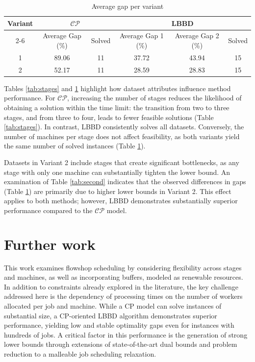 \documentclass[a4paper,final]{article}
\begin{document}
        \begin{table}[H]
            \centering
            \caption{Average gap per variant}
            \label{tab:machines}
            \begin{tabular}{|c|cc|ccc|}
            \hline
            \multirow{2}{*}{Variant} & \multicolumn{2}{|c|}{$\mathcal{CP}$} & \multicolumn{3}{|c|}{LBBD}                         \\ \cline{2-6}
                                     & Average Gap (\%)      & Solved     & Average Gap 1 (\%) & Average Gap 2 (\%) & Solved \\ \hline
            1                        & 89.06                 & 11         & 37.72              & 43.94              & 15     \\
            2                        & 52.17                 & 11         & 28.59              & 28.83              & 15 \\ \hline
            \end{tabular}
        \end{table}

        Tables \ref{tab:stages} and \ref{tab:machines} highlight how dataset attributes influence method performance. For $\mathcal{CP}$, increasing the number of stages reduces the likelihood of obtaining a solution within the time limit: the transition from two to three stages, and from three to four, leads to fewer feasible solutions (Table \ref{tab:stages}). In contrast, LBBD consistently solves all datasets. Conversely, the number of machines per stage does not affect feasibility, as both variants yield the same number of solved instances (Table \ref{tab:machines}).

        Datasets in Variant 2 include stages that create significant bottlenecks, as any stage with only one machine can substantially tighten the lower bound. An examination of Table \ref{tab:second} indicates that the observed differences in gaps (Table \ref{tab:machines}) are primarily due to higher lower bounds in Variant 2. This effect applies to both methods; however, LBBD demonstrates substantially superior performance compared to the $\mathcal{CP}$ model.
\section{Further work} \label{sec:conclusions}
This work examines flowshop scheduling by considering flexibility across stages and machines, as well as incorporating buffers, modeled as renewable resources. In addition to constraints already explored in the literature, the key challenge addressed here is the dependency of processing times on the number of workers allocated per job and machine. While a CP model can solve instances of substantial size, a CP-oriented LBBD algorithm demonstrates superior performance, yielding low and stable optimality gaps even for instances with hundreds of jobs. A critical factor in this performance is the generation of strong lower bounds through extensions of state-of-the-art dual bounds and problem reduction to a malleable job scheduling relaxation.
\end{document}
